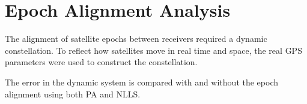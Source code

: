 
\section{Epoch Alignment Analysis}

The alignment of satellite epochs between receivers required a dynamic constellation. To reflect how satellites move in real time and space, the real GPS parameters were used to construct the constellation.

The error in the dynamic system is compared with and without the epoch alignment using both PA and NLLS.
